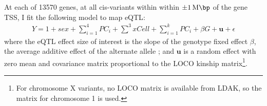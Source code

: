 At each of 13570 genes, at all cis-variants within within $\pm \SI{1}{\mega\bp}$ of the gene \gls{TSS}, I fit the following model to map \gls{eQTL}:
\begin{equation}
\begin{split}
Y = 1 + sex + \sum_{i=1}^{4}{PC_i} + \sum_{}^{3}{xCell} + \sum_{i=1}^{k}{PC_i} + \beta G + \mathbf{u} + \epsilon
\end{split}
\label{eq:hird_reQTL_limix_model}
\end{equation}
where the \gls{eQTL} effect size of interest is the slope of the genotype fixed effect $\beta$, the average additive effect of the alternate allele \autocite{visscher2019Fisher1918Paper};
and $\mathbf{u}$ is a random effect with zero mean and covariance matrix proportional to the \gls{LOCO} kinship matrix\footnote{For chromosome X variants, no \gls{LOCO} matrix is available from LDAK, so the matrix for chromosome 1 is used.}.

